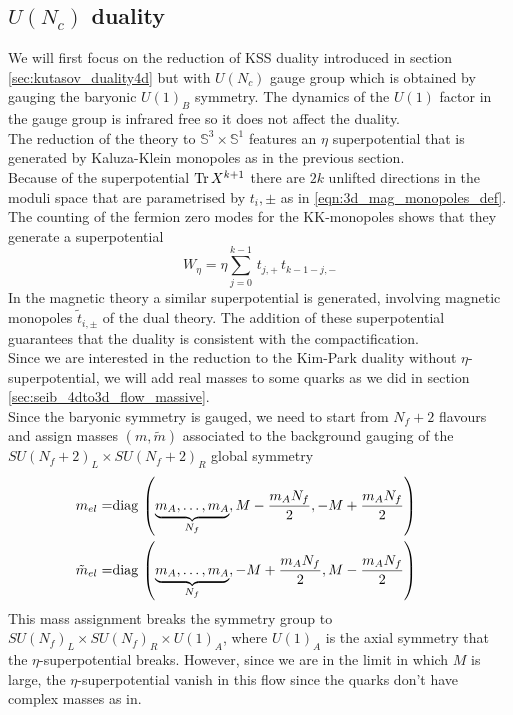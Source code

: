 \subsection{$U(N_c)$ duality}
We will first focus on the reduction of KSS duality introduced in section \ref{sec:kutasov_duality4d} but with $U(N_c)$ gauge group which is obtained by gauging the baryonic $U(1)_B$ symmetry.
The dynamics of the $U(1)$ factor in the gauge group is infrared free so it does not affect the duality.\\
The reduction of the theory to $\mathbb{S}^3 \times \mathbb{S}^1$ features an $\eta$ superpotential that is generated by Kaluza-Klein monopoles as in the previous section.\\
Because of the superpotential $\mathrm{Tr } \,{X^{k+1}} $ there are $2k $ unlifted directions in the moduli space that are parametrised by $t_i,\pm$ as in \eqref{eqn:3d_mag_monopoles_def}. 
The counting of the fermion zero modes for the KK-monopoles shows that they generate a superpotential \cite{Nii:2014jsa}
\begin{equation}
W_{\eta} = \eta \sum_{j=0}^{k-1} \, t_{j,+} \, t_{k-1-j,-} 
\end{equation}
In the magnetic theory a similar superpotential is generated, involving magnetic monopoles $\tilde{t}_{i,\pm}$ of the dual theory.
The addition of these superpotential guarantees that the duality is consistent with the compactification.\\
Since we are interested in the reduction to the Kim-Park duality without $\eta$-superpotential, we will add real masses to some quarks as we did in section \ref{sec:seib_4dto3d_flow_massive}.\\
Since the baryonic symmetry is gauged, we need to start from $N_f +2 $ flavours and assign masses $(m,\tilde{m})$ associated to the background gauging of the $SU(N_f+2)_L \times SU(N_f +2 )_R$ global symmetry
\begin{align}
 m_{el} = & \hbox{diag\,} \left( \underbrace{m_A,\dotsc,m_A}_{N_f}, M - \frac{m_A N_f}{2},-M +\frac{m_A N_f}{2}\right) \qquad \\
 \tilde{m}_{el} = & \hbox{diag\,} \left( 
 \underbrace{
 m_A , \dotsc, m_A
 }_{N_f}
 ,-M +\frac{m_A N_f}{2}, M - \frac{m_A N_f}{2} \right)
\end{align}
This mass assignment breaks the symmetry group to $SU(N_f)_L \times SU(N_f)_R \times U(1)_A $, where $U(1)_A$ is the axial symmetry that the $\eta$-superpotential breaks. 
However, since we are in the limit in which $M $ is large, the $\eta$-superpotential vanish in this flow since the quarks don't have complex masses as in\cite{Aharony:2013dha}.
